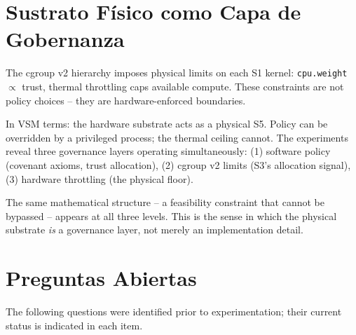 \documentclass[11pt, a4paper]{article}
\begin{document}
\section{Sustrato Físico como Capa de Gobernanza}
\label{sec:substrate}

The cgroup v2 hierarchy imposes physical limits on each S1 kernel:
\texttt{cpu.weight} $\propto$ trust, thermal throttling caps available
compute.
These constraints are not policy choices -- they are hardware-enforced
boundaries.

In VSM terms: the hardware substrate acts as a physical S5.
Policy can be overridden by a privileged process; the thermal ceiling
cannot.
The experiments reveal three governance layers operating simultaneously:
(1) software policy (covenant axioms, trust allocation),
(2) cgroup v2 limits (S3's allocation signal),
(3) hardware throttling (the physical floor).

The same mathematical structure -- a feasibility constraint that cannot
be bypassed -- appears at all three levels.
This is the sense in which the physical substrate \emph{is} a governance
layer, not merely an implementation detail.


\section{Preguntas Abiertas}
\label{sec:openq}

The following questions were identified prior to experimentation;
their current status is indicated in each item.
\end{document}
